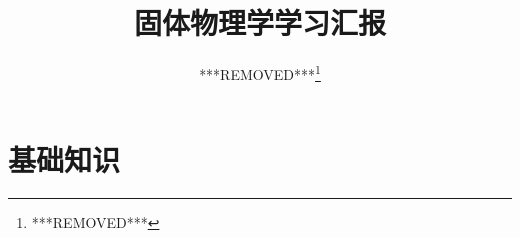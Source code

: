 \documentclass{ctexart}
\title{固体物理学学习汇报}
\author{***REMOVED***\thanks{***REMOVED***}}
\theoremstyle{definition}
\begin{document}
\maketitle
\tableofcontents
\clearpage

\section{基础知识}

\end{document}
